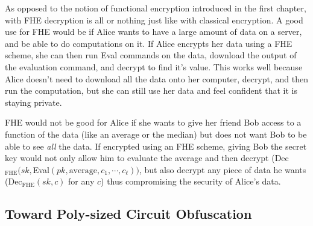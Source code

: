 \documentclass[12pt,twoside]{reedthesis}
\begin{document}
    \par As opposed to the notion of functional encryption introduced in the first chapter, with FHE decryption is all or nothing just like with classical encryption. A good use for FHE would be if Alice wants to have a large amount of data on a server, and be able to do computations on it. If Alice encrypts her data using a FHE scheme, she can then run Eval commands on the data, download the output of the evaluation command, and decrypt to find it's value. This works well because Alice doesn't need to download all the data onto her computer, decrypt, and then run the computation, but she can still use her data and feel confident that it is staying private.
    \par FHE would not be good for Alice if she wants to give her friend Bob access to a function of the data (like an average or the median) but does not want Bob to be able to see \textit{all} the data. If encrypted using an FHE scheme, giving Bob the secret key would not only allow him to evaluate the average and then decrypt (Dec$_\text{FHE}(sk,$Eval$(pk,\text{average},c_1,\cdots,c_\ell))$, but also decrypt any piece of data he wants (Dec$_\text{FHE}(sk,c)$ for any $c$) thus compromising the security of Alice's data.
    
    
    \subsection{Toward Poly-sized Circuit Obfuscation}
    
    \newcommand{\ionc}[0]{i\mathcal{O}_\text{NC}}
     \newcommand{\fhe}[0]{_\text{FHE}}
\end{document}
